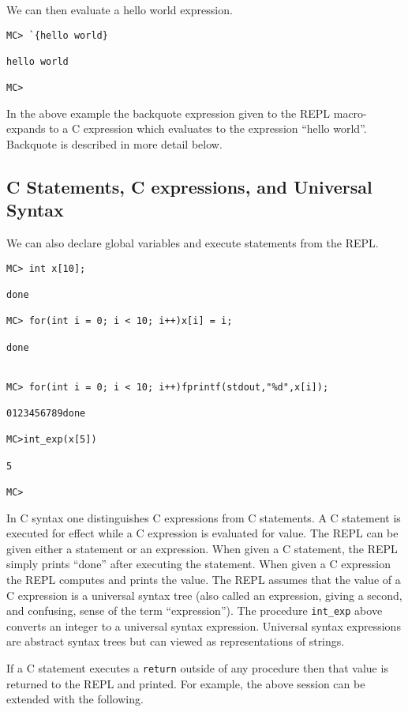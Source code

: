 \documentclass{article}
\begin{document}
We can then evaluate a hello world expression.

\begin{verbatim}
MC> `{hello world}

hello world

MC>
\end{verbatim}

In the above example the backquote expression given to the REPL macro-expands to a C expression which evaluates to the expression ``hello world''.
Backquote is described in more detail below.

\subsection{C Statements, C expressions, and Universal Syntax}

We can also declare global variables and execute statements from the REPL.

\begin{verbatim}
MC> int x[10];

done

MC> for(int i = 0; i < 10; i++)x[i] = i;

done


MC> for(int i = 0; i < 10; i++)fprintf(stdout,"%d",x[i]);

0123456789done

MC>int_exp(x[5])

5

MC>
\end{verbatim}

In C syntax one distinguishes C expressions from C statements.  A C
statement is executed for effect while a C expression is evaluated for
value. The REPL can be given either a statement or an expression.  When
given a C statement, the REPL simply prints ``done'' after executing
the statement.
When given a C expression the REPL computes and prints
the value.  The REPL assumes that the value of a C expression
is a universal syntax tree (also called an expression, giving a second, and confusing,
sense of the term ``expression''). The procedure {\tt int\_exp} above
converts an integer to a universal syntax expression.  Universal syntax expressions are abstract
syntax trees but can viewed as representations of strings.

If a C statement executes a {\tt return} outside of any
procedure then that value is returned to the REPL and printed.
For example, the above session can be extended with the following.
\end{document}
